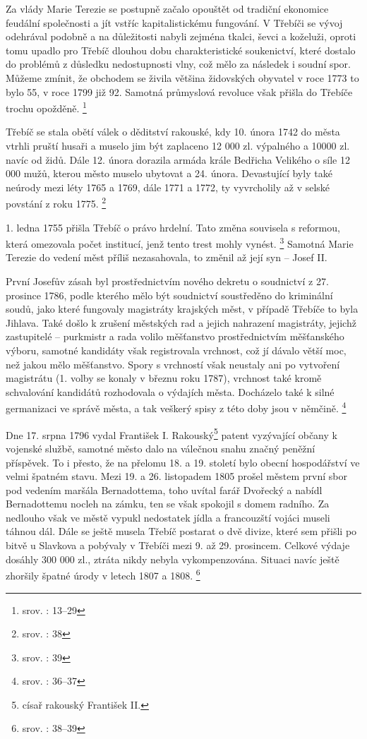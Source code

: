 \documentclass[a4paper,oneside,12p]{report}
\begin{document}
Za vlády Marie Terezie se postupně začalo opouštět od tradiční ekonomice feudální společnosti a jít vstříc kapitalistickému fungování.
V Třebíči se vývoj odehrával podobně a na důležitosti nabyli zejména tkalci, ševci a koželuži, oproti tomu upadlo pro Třebíč dlouhou dobu charakteristické soukenictví, které dostalo do problémů z důsledku nedostupnosti vlny, což mělo za následek i soudní spor.
Můžeme zmínit, že obchodem se živila většina židovských obyvatel v roce 1773 to bylo 55, v roce 1799 již 92.
Samotná průmyslová revoluce však přišla do Třebíče trochu opožděně. \footnote{srov. \cite{Janak1981}: 13--29}

Třebíč se stala obětí válek o děditství rakouské, kdy 10. února 1742 do města vtrhli pruští husaři a muselo jim být zaplaceno 12 000 zl. výpalného a 10000 zl. navíc od židů.
Dále 12. února dorazila armáda krále Bedřicha Velikého o síle 12 000 mužů, kterou město muselo ubytovat a 24. února.
Devastující byly také neúrody mezi léty 1765 a 1769, dále 1771 a 1772, ty vyvrcholily až v selské povstání z roku 1775. \footnote{srov. \cite{Janak1981}: 38}

1. ledna 1755 přišla Třebíč o právo hrdelní.
Tato změna souvisela s reformou, která omezovala počet institucí, jenž tento trest mohly vynést. \footnote{srov. \cite{Janak1981}: 39}
Samotná Marie Terezie do vedení měst příliš nezasahovala, to změnil až její syn -- Josef II.

První Josefův zásah byl prostřednictvím nového dekretu o soudnictví z 27. prosince 1786, podle kterého mělo být soudnictví soustředěno do kriminální soudů, jako které fungovaly magistráty krajských měst, v případě Třebíče to byla Jihlava.
Také došlo k zrušení městských rad a jejich nahrazení magistráty, jejichž zastupitelé -- purkmistr a rada volilo měšťanstvo prostřednictvím měšťanského výboru, samotné kandidáty však registrovala vrchnost, což jí dávalo větší moc, než jakou mělo měšťanstvo.
Spory s vrchností však neustaly ani po vytvoření magistrátu (1. volby se konaly v březnu roku 1787), vrchnost také kromě schvalování kandidátů rozhodovala o výdajích města.
Docházelo také k silné germanizaci ve správě města, a tak veškerý spisy z této doby jsou v němčině. \footnote{srov. \cite{Janak1981}: 36--37}

Dne 17. srpna 1796 vydal František I. Rakouský\footnote{císař rakouský František II.} patent vyzývající občany k vojenské službě, samotné město dalo na válečnou snahu značný peněžní příspěvek.
To i přesto, že na přelomu 18. a 19. století bylo obecní hospodářství ve velmi špatném stavu.
Mezi 19. a 26. listopadem 1805 prošel městem první sbor pod vedením maršála Bernadottema, toho uvítal farář Dvořecký a nabídl Bernadottemu nocleh na zámku, ten se však spokojil s domem radního.
Za nedlouho však ve městě vypukl nedostatek jídla a francouzští vojáci museli táhnou dál.
Dále se ještě musela Třebíč postarat o dvě divize, které sem přišli po bitvě u Slavkova a pobývaly v Třebíči mezi 9. až 29. prosincem.
Celkové výdaje dosáhly 300 000 zl., ztráta nikdy nebyla vykompenzována.
Situaci navíc ještě zhoršily špatné úrody v letech 1807 a 1808. \footnote{srov. \cite{Janak1981}: 38--39}
\end{document}

